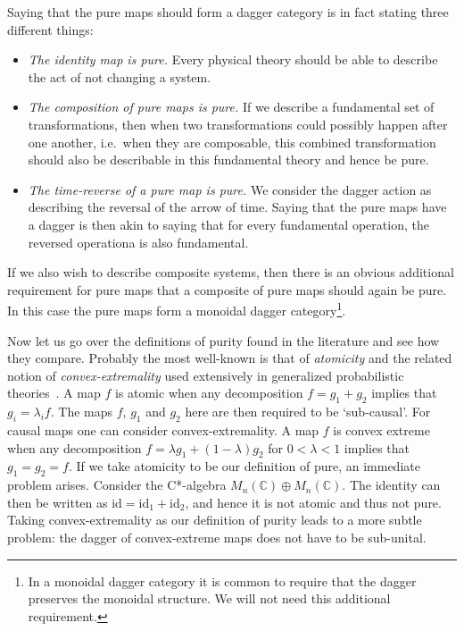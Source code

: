 \documentclass[b5paper,onecolumn,12pt,accepted=2019-05-03, issue=1, volume=1, shorttitle=papers/compositionality-1-1]{compositionalityarticle}
\numberwithin{counter}{section}
\newcommand{\C}{\mathbb{C}}
\newcommand{\id}{\text{id}}
\begin{document}
Saying that the pure maps should form a dagger category is in fact stating three different things:
\begin{itemize}
    \item \emph{The identity map is pure.} Every physical theory should be able to describe the act of not changing a system.
    \item \emph{The composition of pure maps is pure.} If we describe a fundamental set of transformations, then when two transformations could possibly happen after one another, i.e.\ when they are composable, this combined transformation should also be describable in this fundamental theory and hence be pure.
    \item \emph{The time-reverse of a pure map is pure.} We consider the dagger action as describing the reversal of the arrow of time. Saying that the pure maps have a dagger is then akin to saying that for every fundamental operation, the reversed operationa is also fundamental.
\end{itemize}

If we also wish to describe composite systems, then there is an obvious additional requirement for pure maps that a composite of pure maps should again be pure. In this case the pure maps form a monoidal dagger category\footnote{In a monoidal dagger category it is common to require that the dagger preserves the monoidal structure. We will not need this additional requirement.}.

Now let us go over the definitions of purity found in the literature and see how they compare. 
Probably the most well-known is that of \emph{atomicity} and the related notion of \emph{convex-extremality} used extensively in generalized probabilistic theories~\cite{barrett2007information,chiribella2010probabilistic,chiribella2011informational}. A map $f$ is atomic when any decomposition $f=g_1+g_2$ implies that $g_i = \lambda_i f$. The maps $f$, $g_1$ and $g_2$ here are then required to be `sub-causal'. For causal maps one can consider convex-extremality. A map $f$ is convex extreme when any decomposition $f=\lambda g_1 + (1-\lambda)g_2$ for $0<\lambda<1$ implies that $g_1=g_2=f$. If we take atomicity to be our definition of pure, an immediate problem arises. Consider the C*-algebra $M_n(\C)\oplus M_n(\C)$. The identity can then be written as $\id = \id_1+\id_2$, and hence it is not atomic and thus not pure. Taking convex-extremality as our definition of purity leads to a more subtle problem: the dagger of convex-extreme maps does not have to be sub-unital.
\end{document}
